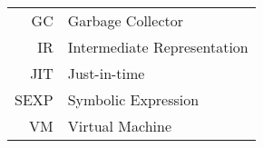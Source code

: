 \documentclass[english,master,twoside]{ctufit-thesis}
\begin{document}
\chapter{\thectufitabbreviationlabel}

\begin{tabular}{rl}
	GC   & Garbage Collector           \\
	IR   & Intermediate Representation \\
	JIT  & Just-in-time                \\
	SEXP & Symbolic Expression         \\
	VM   & Virtual Machine             \\
\end{tabular}


\resumeTOCentries
\mainmatter\mainmatterinit %










\appendix\appendixinit %

\backmatter %

\printbibliography %
\end{document}
